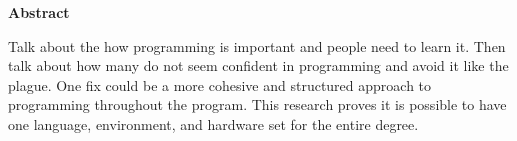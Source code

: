 \begin{flushleft}
    \Large
    \textbf{Abstract}
    \vspace{5pt}
    
    \normalsize
    Talk about the how programming is important and people need to 
    learn it. Then talk about how many do not seem confident in 
    programming and avoid it like the plague. One fix could be a 
    more cohesive and structured approach to programming throughout 
    the program. This research proves it is possible to have one 
    language, environment, and hardware set for the entire degree.
\end{flushleft}
